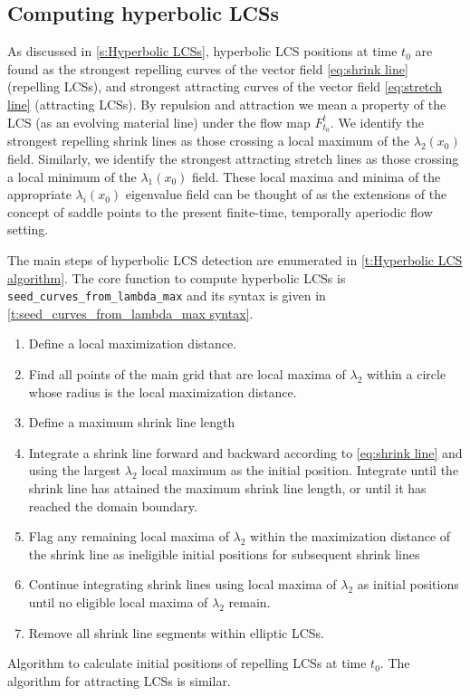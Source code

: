 \documentclass{article}
\begin{document}
\subsection{Computing hyperbolic LCSs}

As discussed in \cref{s:Hyperbolic LCSs}, hyperbolic LCS positions at time $t_0$ are found as the strongest repelling curves of the vector field \cref{eq:shrink line} (repelling LCSs), and strongest attracting curves of the vector field \cref{eq:stretch line} (attracting LCSs).
By repulsion and attraction we mean a property of the LCS (as an evolving material line) under the flow map $F_{t_0}^t$.
We identify the strongest repelling shrink lines as those crossing a local maximum of the $\lambda_2(x_0)$ field.
Similarly, we identify the strongest attracting stretch lines as those crossing a local minimum of the $\lambda_1(x_0)$ field.
These local maxima and minima of the appropriate $\lambda_i(x_0)$ eigenvalue field can be thought of as the extensions of the concept of saddle points to the present finite-time, temporally aperiodic flow setting.

The main steps of hyperbolic LCS detection are enumerated in \cref{t:Hyperbolic LCS algorithm}.
The core function to compute hyperbolic LCSs is \lstinline!seed_curves_from_lambda_max! and its syntax is given in \cref{t:seed_curves_from_lambda_max syntax}.

\begin{table}
\begin{enumerate}
\item Define a local maximization distance.
\item Find all points of the main grid that are local maxima of $\lambda_2$ within a circle whose radius is the local  maximization distance.
\item Define a maximum shrink line length
\item Integrate a shrink line forward and backward according to \cref{eq:shrink line} and using the largest $\lambda_2$ local maximum as the initial position. Integrate until the shrink line has attained the maximum shrink line length, or until it has reached the domain boundary.
\item Flag any remaining local maxima of $\lambda_2$ within the maximization distance of the shrink line as ineligible initial positions for subsequent shrink lines
\label{i:flag maxima}
\item Continue integrating shrink lines using local maxima of $\lambda_2$ as initial positions until no eligible local maxima of $\lambda_2$ remain.
\item Remove all shrink line segments within elliptic LCSs.
\end{enumerate}
\caption{Algorithm to calculate initial positions of repelling LCSs at time $t_0$.
The algorithm for attracting LCSs is similar.}
\label{t:Hyperbolic LCS algorithm}
\end{table}
\end{document}
